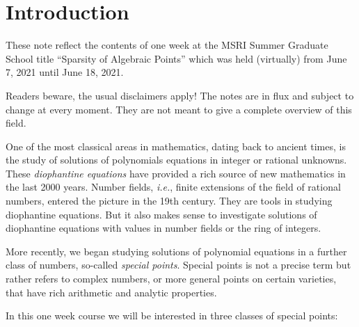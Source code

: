 \chapter{Introduction}

These note reflect the contents of  one week  at the MSRI
Summer Graduate School title ``Sparsity of Algebraic Points'' which
was held (virtually) from June 7, 2021 until June 18, 2021.

Readers beware, the usual disclaimers apply! The notes are in flux and
subject to change at every moment. They are not meant to give a
complete overview of this field.

One of the most classical areas in mathematics, dating back to ancient
times, is the study of solutions of polynomials equations in integer
or rational unknowns. These \textit{diophantine equations} have
provided a rich source of new mathematics in the last 2000 years.
Number fields, \textit{i.e.}, finite extensions of the field of
rational numbers, entered the picture in the 19th century. They are
tools in studying diophantine equations. But it also makes sense to
investigate solutions of diophantine equations with values in number
fields or the ring of integers.

More recently, we began studying solutions of polynomial equations in
a further class of numbers, so-called \textit{special points}. Special
points is not a precise term but rather refers to complex numbers, or
more general points on certain varieties, that have rich arithmetic
and analytic properties.

In this one week course we will be interested in three classes of
special points:

